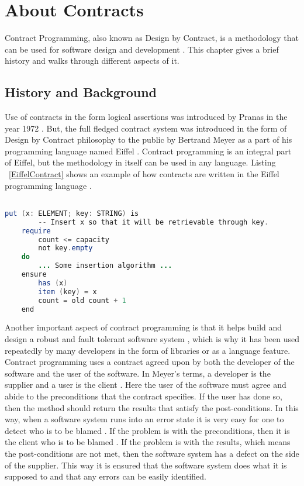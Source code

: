 \chapter{About Contracts}

Contract Programming, also known as Design by Contract, is a methodology that can be used for software design and development \cite{DesignByContractByExample}. This chapter gives a brief history and walks through different aspects of it.

\section{History and Background}

Use of contracts in the form logical assertions was introduced by Pranas in the year 1972 \cite{findler2014behavioral}. But, the full fledged contract system was introduced in the form of Design by Contract philosophy to the public by Bertrand Meyer as a part of his programming language named Eiffel \cite{findler2014behavioral}. Contract programming is an integral part of Eiffel, but the methodology in itself can be used in any language. Listing ~\ref{EiffelContract} shows an example of how contracts are written in the Eiffel programming language \cite{DesignByContractByExample}.

\begin{minipage}{\linewidth}
\begin{lstlisting}[frame=single, language=Java, caption={Contract in Eiffel \cite{meyer1998building}}, label={EiffelContract}, captionpos=b, breaklines=true]

put (x: ELEMENT; key: STRING) is
		-- Insert x so that it will be retrievable through key.
	require
		count <= capacity
		not key.empty
	do
		... Some insertion algorithm ...
	ensure
		has (x)
		item (key) = x 
		count = old count + 1
	end
\end{lstlisting}
\end{minipage}


Another important aspect of contract programming is that it helps build and design a robust and fault tolerant software system \cite{ceballos2005constraint}, which is why it has been used repeatedly by many developers in the form of libraries or as a language feature.
Contract programming uses a contract agreed upon by both the developer of the software and the user of the software. In Meyer's terms, a developer is the supplier and a user is the client \cite{ApplyingDesignByContract}.  
Here the user of the software must agree and abide to the preconditions that the contract specifies. If the user has done so, then the method should return the results that satisfy the post-conditions. In this way, when a software system runs into an error state it is very easy for one to detect who is to be blamed \cite{dimoulas2011correct}. If the problem is with the preconditions, then it is the client who is to be blamed \cite{rajkumar2015designing}. If the problem is with the results, which means the post-conditions are not met, then the software system has a defect on the side of the supplier. This way it is ensured that the software system does what it is supposed to and that any errors can be easily identified.

